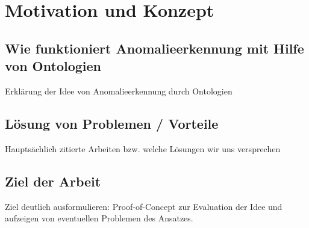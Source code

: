 \chapter{Motivation und Konzept}
\section{Wie funktioniert Anomalieerkennung mit Hilfe von Ontologien}
Erklärung der Idee von Anomalieerkennung durch Ontologien
\section{Lösung von Problemen / Vorteile}
Hauptsächlich zitierte Arbeiten bzw. welche Lösungen wir uns versprechen
\section{Ziel der Arbeit}
Ziel deutlich ausformulieren: Proof-of-Concept zur Evaluation der Idee und aufzeigen von eventuellen Problemen des Ansatzes.